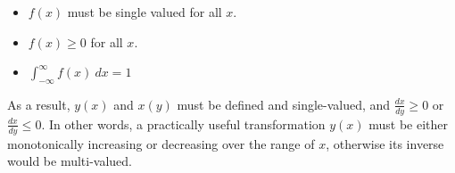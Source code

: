 \documentclass[11pt]{report}
\begin{document}
\begin{enumerate}
\begin{itemize}
 \item $f(x)$ must be single valued for all $x$.
 \item $f(x) \geq 0$ for all $x$.
 \item $\int_{- \infty}^{\infty} f(x) \ dx = 1	$
 \end{itemize} As a result, $y(x)$ and $x(y)$ must be defined and single-valued, and $\frac{dx}{dy} \geq 0$ or $\frac{dx}{dy} \leq 0$. In other words, a practically useful transformation $y(x)$ must be either monotonically increasing or decreasing over the range of $x$, otherwise its inverse would be multi-valued.


\end{enumerate}
\end{document}
